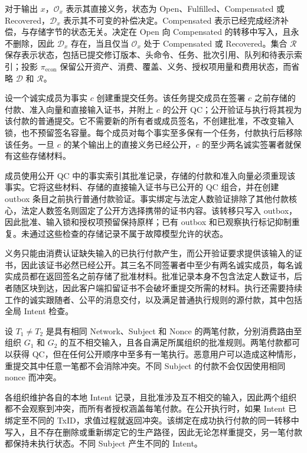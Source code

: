 对于输出 $x$，$\mathcal O_x$ 表示其直接义务，状态为 Open、Fulfilled、Compensated 或 Recovered，$\mathcal D_x$ 表示其不可变的补偿决定。Compensated 表示已经完成经济补偿，与存储字节的状态无关。决定在 Open 向 Compensated 的转移中写入，且永不删除，因此 $\mathcal D_x$ 存在，当且仅当 $\mathcal O_x$ 处于 Compensated 或 Recovered。集合 $\mathcal R$ 保存表示状态，包括已提交修订版本、头命令、任务、批次引用、队列和待表示索引；投影 $\pi_{\mathrm{econ}}$ 保留公开资产、消费、覆盖、义务、授权项用量和费用状态，而省略 $\mathcal D$ 和 $\mathcal R$。

\begin{lemma}[重提交保持授权不变]
\label{lem:security-resubmission}
设一个诚实成员为事实 $c$ 创建重提交任务。该任务提交成员在签署 $c$ 之前存储的付款、准入向量和直接输入证书，并附上 $c$ 的公开 QC；公开验证与执行将其视为该付款的普通提交。它不需要新的所有者或成员签名，不创建批准，不改变输入锁，也不预留签名容量。每个成员对每个事实至多保有一个任务，付款执行后移除该任务。一旦 $c$ 的某个输出上的直接义务已经公开，$c$ 的至少两名诚实签署者就保有这些存储材料。
\end{lemma}
\begin{IEEEproof}
成员使用公开 QC 中的事实索引其批准记录，存储的付款和准入向量必须重现该事实。它将这些材料、存储的直接输入证书与已公开的 QC 组合，并在创建 outbox 条目之前执行普通付款验证。事实绑定与法定人数验证排除了其他付款核心，法定人数签名则固定了公开方选择携带的证书内容。该转移只写入 outbox，因此批准、输入锁和授权项预留保持原样；已有 outbox 和已观察执行标记抑制重复。未通过这些检查的存储记录不属于故障模型允许的状态。

义务只能由消费认证缺失输入的已执行付款产生，而公开验证要求提供该输入的证书，因此该证书必然已经公开。其三名不同签署者中至少有两名诚实成员，每名诚实成员都在返回签名之前存储了批准材料。批准记录本身不包含法定人数证书，后者随区块到达，因此客户端扣留证书不会破坏重提交所需的材料。执行还需要持续工作的诚实跟随者、公平的消息交付，以及满足普通执行规则的源付款，其中包括全局 Intent 检查。
\end{IEEEproof}

\begin{lemma}
\label{lem:security-intent}
设 $T_1\ne T_2$ 是具有相同 Network、Subject 和 Nonce 的两笔付款，分别消费路由至组织 $G_1$ 和 $G_2$ 的互不相交输入，且各自满足所属组织的批准规则。两笔付款都可以获得 QC，但在任何公开顺序中至多有一笔执行。恶意用户可以造成这种情形，重提交其中任意一笔都不会消除冲突。不同 Subject 的付款不会仅因使用相同 nonce 而冲突。
\end{lemma}
\begin{IEEEproof}
各组织维护各自的本地 Intent 记录，且批准涉及互不相交的输入，因此两个组织都不会观察到冲突，而所有者授权涵盖每笔付款。在公开执行时，如果 Intent 已绑定至不同的 TxID，求值过程就返回冲突。该绑定在成功执行付款的同一转移中写入，且不存在删除或重新绑定它的生产路径，因此无论怎样重提交，另一笔付款都保持未执行状态。不同 Subject 产生不同的 Intent。
\end{IEEEproof}

